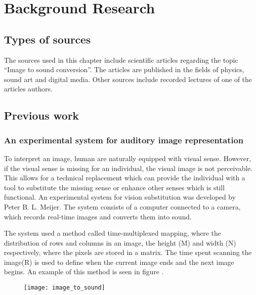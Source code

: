 \chapter{Background Research}\label{ch:bgresearch}



\section{Types of sources}\label{sec:typesofsources} 
The sources used in this chapter include scientific articles regarding the topic “Image to sound conversion”. The articles are published in the fields of physics, sound art and digital media. Other sources include recorded lectures of one of the articles authors.

\section{Previous work}\label{sec:previouswork}

\subsection{An experimental system for auditory image representation}\label{sec:experimentalsystem}

To interpret an image, human are naturally equipped with visual sense. However, if the visual sense is missing for an individual, the visual image is not perceivable. This allows for a technical replacement which can provide the individual with a tool to substitute the missing sense or enhance other senses which is still functional. An experimental system for vision substitution was developed by Peter B. L. Meijer\cite{Meijer1992}. The system consists of a computer connected to a camera, which records real-time images and converts them into sound. 

The system used a method called time-multiplexed mapping, where the distribution of rows and columns in an image, the height (M) and width (N) respectively, where the pixels are stored in a matrix. The time spent scanning the image(R) is used to define when the current image ends and the next image begins. An example of this method is seen in figure . 

\begin{figure}[!h] 
\centering
\texttt{[image: image\_to\_sound]}
\caption{\label{fig:image_to_sound}\cite{Meijer1992}}
\end{figure}

